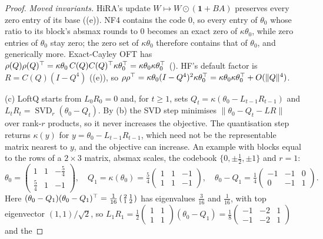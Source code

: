 \begin{proof}
\emph{Moved invariants.} HiRA's update $W\mapsto W\odot(\mathbf 1+BA)$ preserves every zero entry of its base
((e)). NF4 contains the code $0$, so every entry of $\theta_0$ whose ratio to its block's absmax
rounds to $0$ becomes an exact zero of $\kappa\theta_0$, while zero entries of $\theta_0$ stay zero; the zero set of
$\kappa\theta_0$ therefore contains that of $\theta_0$, and generically more. Exact-Cayley OFT has
$\rho(Q)\rho(Q)^{\top}=\kappa\theta_0\,C(Q)C(Q)^{\top}\kappa\theta_0^{\top}=\kappa\theta_0\kappa\theta_0^{\top}$ (). HF's
default factor is $R=C(Q)(I-Q^4)$ ((e)), so $\rho\rho^{\top}=\kappa\theta_0(I-Q^4)^2\kappa\theta_0^{\top}=
\kappa\theta_0\kappa\theta_0^{\top}+O(\lVert Q\rVert^4)$.

(c) LoftQ starts from $L_0R_0=0$ and, for $t\ge1$, sets $Q_t=\kappa(\theta_0-L_{t-1}R_{t-1})$ and
$L_tR_t=\operatorname{SVD}_r(\theta_0-Q_t)$. By (b) the SVD step minimises $\lVert\theta_0-Q_t-LR\rVert$ over
rank-$r$ products, so it never increases the objective. The quantisation step returns $\kappa(y)$ for $y=\theta_0-L_{t-1}
R_{t-1}$, which need not be the representable matrix nearest to $y$, and the objective can increase. An example with blocks
equal to the rows of a $2\times3$ matrix, absmax scales, the codebook $\{0,\pm\tfrac12,\pm1\}$ and $r=1$:
\[\theta_0=\begin{pmatrix}1&1&-\tfrac54\\ \tfrac54&1&-1\end{pmatrix},\quad
Q_1=\kappa(\theta_0)=\tfrac54\begin{pmatrix}1&1&-1\\1&1&-1\end{pmatrix},\quad
\theta_0-Q_1=\tfrac14\begin{pmatrix}-1&-1&0\\0&-1&1\end{pmatrix}.\]
Here $(\theta_0-Q_1)(\theta_0-Q_1)^{\top}=\tfrac1{16}\left(\begin{smallmatrix}2&1\\1&2\end{smallmatrix}\right)$ has eigenvalues
$\tfrac3{16}$ and $\tfrac1{16}$, with top eigenvector $(1,1)/\sqrt2$, so $L_1R_1=\tfrac12\left(\begin{smallmatrix}1&1\\1&1
\end{smallmatrix}\right)(\theta_0-Q_1)=\tfrac18\left(\begin{smallmatrix}-1&-2&1\\-1&-2&1\end{smallmatrix}\right)$ and the

\end{proof}
